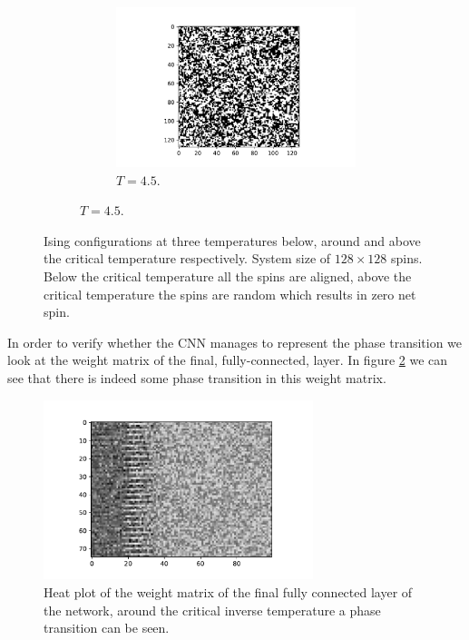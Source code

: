 \documentclass[10 pt, a4paper]{article}
\begin{document}
\begin{figure}[H]
\begin{subfigure}[b]{0.33\textwidth}
\begin{figure}[H]
\includegraphics[width=\textwidth]{lattice128c}
\caption{$T = 4.5$.}
\end{figure}
\end{subfigure}
\caption{Ising configurations at three temperatures below, around and above the critical temperature respectively. System size of $128 \times 128$ spins. Below the critical temperature all the spins are aligned, above the critical temperature the spins are random which results in zero net spin. }
\label{fig:lattices}
\end{figure}

In order to verify whether the CNN manages to represent the phase transition we look at the weight matrix of the final, fully-connected, layer. In figure \ref{fig:weightscnn} we can see that there is indeed some phase transition in this weight matrix. 

\begin{figure}[H]
\centering
\includegraphics[width=0.7\textwidth]{weights}
\caption{Heat plot of the weight matrix of the final fully connected layer of the network, around the critical inverse temperature a phase transition can be seen. \label{fig:weightscnn}}
\end{figure}
\end{document}
